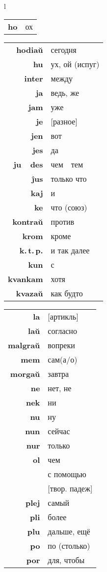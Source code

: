 \documentclass{article}
\begin{document}
\begin{center}
\begin{tabular}{l}
\begin{tabular}{>{\bfseries}rl}
ho & ох \\
\end{tabular}
\hspace{-3em}
\begin{tabular}{>{\bfseries}rl}
hodiaŭ & сегодня \\
hu & ух, ой (испуг) \\
inter & между \\
ja & ведь, же \\
jam & уже \\
je & {}[разное] \\
jen & вот \\
jes & да \\
ju~\textellipsis~des & чем~\textellipsis~тем \\
ĵus & только что \\
kaj & и \\
ke & что (союз) \\
kontraŭ & против \\
krom & кроме \\
k.\,t.\,p. & и так далее \\
kun & с \\
kvankam & хотя \\
kvazaŭ & как будто \\
\end{tabular}
\hspace{-3em}
\begin{tabular}{>{\bfseries}rl}
la & {}[артикль] \\
laŭ & согласно \\
malgraŭ & вопреки \\
mem & сам(а/о) \\
morgaŭ & завтра \\
ne & нет, не \\
nek & ни \\
nu & ну \\
nun & сейчас \\
nur & только \\
ol & чем \\
\multirow{2}{*}{per} & с помощью \\
& {}[твор. падеж] \\
plej & самый \\
pli & более \\
plu & дальше, ещё \\
po & по (столько) \\
por & для, чтобы \\
\end{tabular}

\end{tabular}
\end{center}
\end{document}
